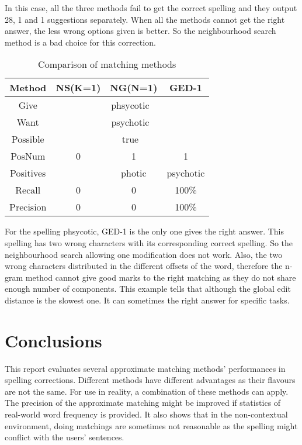 \documentclass[11pt]{article}
\begin{document}
In this case, all the three methods fail to get the correct spelling and they output 28, 1 and 1 suggestions separately. When all the methods cannot get the right answer, the less wrong options given is better. So the neighbourhood search method is a bad choice for this correction.  

\begin{table}[h]
 \begin{center}
\begin{tabular}{ |c||c|c|c| }
      \hline
      Method & NS(K=1) & NG(N=1) & GED-1\\
      \hline
      Give & \multicolumn{3}{|c|}{phsycotic}\\
      Want & \multicolumn{3}{|c|}{psychotic}\\
      Possible & \multicolumn{3}{|c|}{true}\\
      \hline
      PosNum & 0 & 1 & 1\\
      Positives &  & photic & psychotic \\
      Recall & 0 & 0 & 100\%\\
      Precision & 0 & 0 & 100\%\\
      \hline
      \hline
\end{tabular}
\caption{Comparison of matching methods}\label{table7}
 \end{center}
\end{table}

For the spelling phsycotic, GED-1 is the only one gives the right answer. This spelling has two wrong characters with its corresponding correct spelling. So the neighbourhood search allowing one modification does not work. Also, the two wrong characters distributed in the different offsets of the word, therefore the n-gram method cannot give good marks to the right matching as they do not share enough number of components. This example tells that although the global edit distance is the slowest one. It can sometimes the right answer for specific tasks. 

\section{Conclusions}
This report evaluates several approximate matching methods' performances in spelling corrections. Different methods have different advantages as their flavours are not the same. For use in reality, a combination of these methods can apply. The precision of the approximate matching might be improved if statistics of real-world word frequency is provided. It also shows that in the non-contextual environment, doing matchings are sometimes not reasonable as the spelling might conflict with the users' sentences.    
\end{document}
